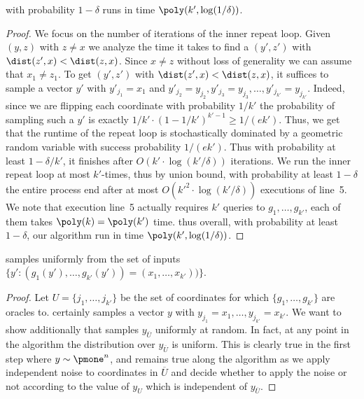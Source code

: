 \begin{theorem}
  with probability $1-\delta$ runs in  time $\poly({k'}, \log(1/\delta))$.
\end{theorem}
\begin{proof}
We focus on the number of iterations of the inner repeat loop.
Given $(y,z)$ with $z\neq x$ we analyze the time it takes to find a $(y',z')$ with $\dist(z',x)<\dist(z,x)$.
Since $x \neq z$ without loss of generality we can assume that $x_1 \neq z_1$. 
To get $(y',z')$ with $\dist(z',x)<\dist(z,x)$, 
it suffices to sample a vector $y'$ with $y'_{j_1}=x_1$ and $y'_{j_2} = y_{j_2}, y'_{j_3} = y_{j_3}, \ldots, y'_{j_{k'}} = y_{j_{k'}}$. Indeed, since we are flipping each coordinate with probability $1/{k'}$ the probability of sampling such a $y'$ is exactly $1/{k'} \cdot (1-1/{k'})^{{k'}-1} \ge 1/(e{k'})$.
Thus, we get that the runtime of the repeat loop is stochastically dominated by a geometric random variable with success probability $1/(e{k'})$. Thus  with probability at least $1-\delta/{k'}$, it finishes after  $O({k'} \cdot \log({k'}/\delta))$ iterations. We run the inner repeat loop at most ${k'}$-times, thus by union bound, with probability at least $1-\delta$ the entire process end after at most  $O({k'}^2 \cdot \log({k'}/\delta))$ executions of line~5.
We note that execution line~5 actually requires ${k'}$ queries to $g_1, \ldots, g_{k'}$, each of them takes $\poly(k) = \poly({k'})$ time. thus overall, with probability at least $1-\delta$, our algorithm run in time $\poly({k'}, \log(1/\delta))$.
\end{proof}

\begin{theorem}
  samples uniformly from the set of inputs $\{y': (g_1(y'), \ldots, g_{k'}(y')) = (x_1, \ldots, x_{k'}))\}$.
\end{theorem}
\begin{proof}
Let $U = \{j_1, \ldots, j_{k'}\}$ be the set of coordinates for which $\{g_1, \ldots, g_{k'}\}$ are	oracles to.
  certainly samples a vector $y$ with $y_{j_1} = x_1, \ldots, y_{j_{k'}} = x_{k'}$.
We want to show additionally that  samples $y_{\overline{U}}$ uniformly at random. In fact, at any point in the algorithm the distribution over $y_{\overline{U}}$ is uniform. This is clearly true in the first step where $y\sim \pmone^n$, and remains true along the algorithm as we apply independent noise to coordinates in $\overline{U}$ and decide whether to apply the noise or not according to the value of $y_U$ which is independent of $y_{\overline{U}}$.
\end{proof}

